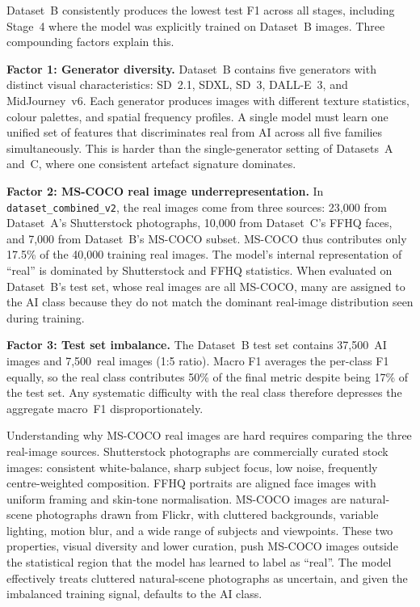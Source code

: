 Dataset~B consistently produces the lowest test F1 across all stages, including Stage~4
where the model was explicitly trained on Dataset~B images. Three compounding factors
explain this.

\textbf{Factor 1: Generator diversity.} Dataset~B contains five generators with distinct
visual characteristics: SD~2.1, SDXL, SD~3, DALL-E~3, and MidJourney~v6. Each generator
produces images with different texture statistics, colour palettes, and spatial frequency
profiles. A single model must learn one unified set of features that discriminates real
from AI across all five families simultaneously. This is harder than the single-generator
setting of Datasets~A and~C, where one consistent artefact signature dominates.

\textbf{Factor 2: MS-COCO real image underrepresentation.} In
\texttt{dataset\_combined\_v2}, the real images come from three sources: 23,000 from
Dataset~A's Shutterstock photographs, 10,000 from Dataset~C's FFHQ faces, and 7,000
from Dataset~B's MS-COCO subset. MS-COCO thus contributes only 17.5\% of the 40,000
training real images. The model's internal representation of ``real'' is dominated by
Shutterstock and FFHQ statistics. When evaluated on Dataset~B's test set, whose real
images are all MS-COCO, many are assigned to the AI class because they do not match the
dominant real-image distribution seen during training.

\textbf{Factor 3: Test set imbalance.} The Dataset~B test set contains 37,500~AI images
and 7,500~real images (1:5 ratio). Macro F1 averages the per-class F1 equally, so the
real class contributes 50\% of the final metric despite being 17\% of the test set.
Any systematic difficulty with the real class therefore depresses the aggregate macro~F1
disproportionately.

Understanding why MS-COCO real images are hard requires comparing the three real-image
sources. Shutterstock photographs are commercially curated stock images: consistent
white-balance, sharp subject focus, low noise, frequently centre-weighted composition.
FFHQ portraits are aligned face images with uniform framing and skin-tone normalisation.
MS-COCO images are natural-scene photographs drawn from Flickr, with cluttered
backgrounds, variable lighting, motion blur, and a wide range of subjects and viewpoints.
These two properties, visual diversity and lower curation, push MS-COCO images outside
the statistical region that the model has learned to label as ``real''. The model
effectively treats cluttered natural-scene photographs as uncertain, and given the
imbalanced training signal, defaults to the AI class.

